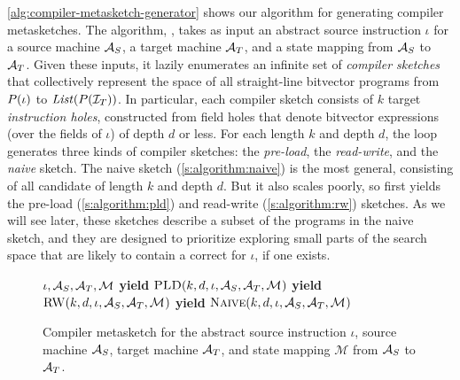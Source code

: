 \autoref{alg:compiler-metasketch-generator} shows our algorithm for generating
compiler metasketches. The algorithm, \CMS, takes as input an abstract source
instruction $\iota$ for a source machine $\mathcal{A}_S$, a target machine $\mathcal{A}_T$,
and a state mapping \Map from $\mathcal{A}_S$ to $\mathcal{A}_T$. Given these inputs, it
lazily enumerates an infinite set of \emph{compiler sketches} that collectively
represent the space of all straight-line bitvector programs from $P(\iota)$
to $\mathit{List}(P(\mathcal{I}_T))$. In particular, each compiler sketch
consists of $k$ target \emph{instruction holes}, constructed from {field holes}
that denote bitvector expressions (over the fields of $\iota$) of depth $d$ or
less. For each length $k$ and depth $d$, the \CMS loop generates three kinds of
compiler sketches: the \emph{pre-load}, the \emph{read-write}, and the
\emph{naive} sketch. The naive sketch (\autoref{s:algorithm:naive}) is the most
general, consisting of all candidate \minicompilers of length $k$ and depth $d$.
But it also scales poorly, so \CMS first yields the pre-load
(\autoref{s:algorithm:pld}) and  read-write (\autoref{s:algorithm:rw}) sketches.
As we will see later, these sketches describe a subset of the programs in the
naive sketch, and they are designed to prioritize exploring small parts of the
search space that are likely to contain a correct \minicompiler for $\iota$, if
one exists.

\begin{figure}[h]
\begin{algorithmic}[1] 
    {$\iota, \mathcal{A}_S, \mathcal{A}_T, \mathcal{M}_{}$} 
     
       
        \State \textbf{yield} $\LCS(k,d,\iota,\arm_S,\arm_T,\Map)$ 
        \State \textbf{yield} $\RW(k,d,\iota,\arm_S,\arm_T,\Map)$ 
        \State \textbf{yield} $\Naive(k,d,\iota,\arm_S,\arm_T,\Map)$ 
      \EndFor
    \EndFor
  \EndFunction
\end{algorithmic}
\caption{Compiler metasketch for the abstract source instruction
$\iota$, source machine $\mathcal{A}_S$, target machine $\mathcal{A}_T$, and state mapping
$\mathcal{M}$ from $\mathcal{A}_S$ to
$\mathcal{A}_T$.\tighten}\label{alg:compiler-metasketch-generator}
\end{figure}

